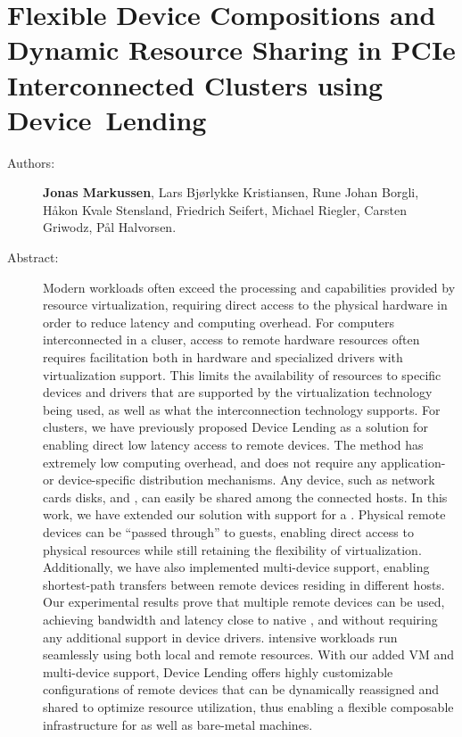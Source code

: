 \chapter{Flexible Device Compositions and Dynamic Resource Sharing in PCIe Interconnected Clusters using Device~Lending}
\label{paper:CC}
\paperthumb

\begin{description}
	\item[Authors:]
		\textbf{Jonas Markussen}, Lars Bj{\o}rlykke Kristiansen, Rune Johan Borgli, H{\aa}kon Kvale Stensland,
		Friedrich Seifert, Michael Riegler, Carsten Griwodz, P{\aa}l Halvorsen.

	\item[Abstract:]
		Modern workloads often exceed the processing and  capabilities provided by resource virtualization,
		requiring direct access to the physical hardware in order to reduce latency and computing overhead.
		For computers interconnected in a cluser, access to remote hardware resources often requires facilitation
		both in hardware and specialized drivers with virtualization support. This limits the availability of
		resources to specific devices and drivers that are supported by the virtualization technology being used, as
		well as what the interconnection technology supports.
		For  clusters, we have previously proposed Device Lending as a solution for enabling direct
		low latency access to remote devices.
		The method has extremely low computing overhead, and does not
		require any application- or device-specific distribution mechanisms. Any  device, such as network cards disks, and
		, can easily be shared among the connected hosts.
		In this work, we have extended our solution with support for a  .
		Physical remote devices can be  ``passed through'' to  guests, enabling direct access to physical resources 
		while still retaining the flexibility of virtualization. Additionally, we have also implemented multi-device
		support, enabling shortest-path  transfers between remote devices residing in different hosts.
		Our experimental results prove that multiple remote devices can be used, achieving bandwidth and latency
		close to native , and without requiring any additional support in device drivers. 
		 intensive workloads run seamlessly using both local and remote resources.
		With our added VM and multi-device support, Device Lending offers highly customizable 
		configurations of remote devices that can be dynamically reassigned and shared to optimize resource 
		utilization, thus enabling a flexible composable  infrastructure for  as well as bare-metal
		machines.


\end{description}
